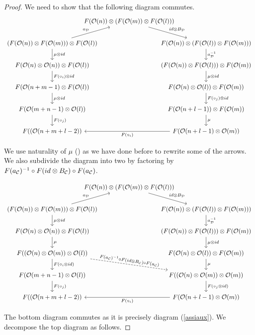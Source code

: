 \documentclass[Thesis.tex]{subfiles}
\begin{document}
\begin{proof}
   We need to show that the following diagram commutes.
   \[
\begin{tikzcd}[column sep = -3em]
& F(\OO(n))\otimes (F(\OO(m))\otimes F(\OO(l)))\arrow[dr, "id\otimes B_\DD"]& \\
(F(\OO(n))\otimes F(\OO(m)))\otimes F(\OO(l))\arrow[d, "\mu\otimes id"]\arrow[ur, "a_\DD"] &  & F(\OO(n))\otimes (F(\OO(l))\otimes F(\OO(m)))\arrow[d, "a_\DD^{-1}"]\\
F(\OO(n)\otimes\OO(n))\otimes F(\OO(l))\arrow[d, "F(\circ_i)\otimes id"] & & (F(\OO(n))\otimes F(\OO(l)))\otimes F(\OO(m))\arrow[d, "\mu\otimes id"]\\
F(\OO(n+m-1)\otimes F(\OO(l))\arrow[d, "\mu\otimes id"] & & F(\OO(n)\otimes \OO(l))\otimes F(\OO(m))\arrow[d, "F(\circ_j)\otimes id"]\\
F(\OO(m+n-1)\otimes\OO(l))\arrow[d, "F(\circ_j)"] & & F(\OO(n+l-1))\otimes F(\OO(m))\arrow[d, "\mu"]\\
F((\OO(n+m+l-2)) & & F(\OO(n+l-1)\otimes\OO(m))\arrow[ll, "F(\circ_i)"]
\end{tikzcd}   
   \]
   
   We use naturality of $\mu$ () as we have done before to rewrite some of the arrows. We also subdivide the diagram into two by factoring by $F(a_{\mathcal C})^{-1}\circ F(id\otimes B_{\mathcal C})\circ F(a_{\mathcal C})$.
   
   \[
\begin{tikzcd}[column sep = -3em]
& F(\OO(n))\otimes (F(\OO(m))\otimes F(\OO(l)))\arrow[dr, "id\otimes B_\DD"]& \\
(F(\OO(n))\otimes F(\OO(m)))\otimes F(\OO(l))\arrow[d, "\mu\otimes id"]\arrow[ur, "a_\DD"] &  & F(\OO(n))\otimes (F(\OO(l))\otimes F(\OO(m)))\arrow[d, "a_\DD^{-1}"]\\
F(\OO(n)\otimes\OO(n))\otimes F(\OO(l))\arrow[d, "\mu"] & & (F(\OO(n))\otimes F(\OO(l)))\otimes F(\OO(m))\arrow[d, "\mu\otimes id"]\\
F((\OO(n)\otimes\OO(m))\otimes \OO(l))\arrow[d, "F(\circ_i\otimes id)"]\arrow[rrd, dashed, "F(a_\CC)^{-1}\circ F(id\otimes B_\CC)\circ F(a_\CC)", sloped] & & F(\OO(n)\otimes \OO(l))\otimes F(\OO(m))\arrow[d, "\mu"]\\
F(\OO(m+n-1)\otimes\OO(l))\arrow[d, "F(\circ_j)"] & & F((\OO(n)\otimes\OO(m))\otimes \OO(m))\arrow[d, "F(\circ_j\otimes id)"]\\
F((\OO(n+m+l-2)) & & F(\OO(n+l-1)\otimes\OO(m))\arrow[ll, "F(\circ_i)"]
\end{tikzcd}   
   \]
   
   The bottom diagram commutes as it is precisely diagram (\ref{assiaux}). We decompose the top diagram as follows.
   

\end{proof}
\end{document}
